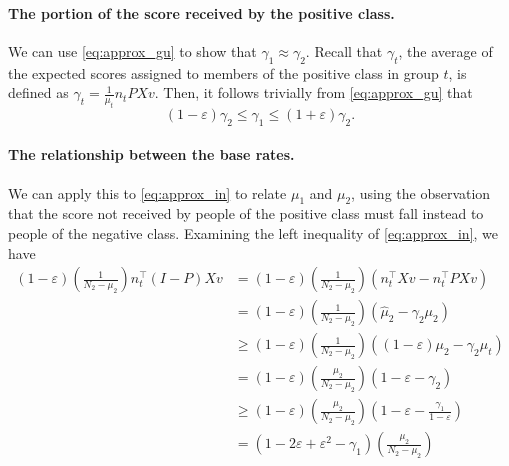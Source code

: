 \documentclass[11pt]{article}
\newcommand{\xhdr}[1]{\vspace{-0.2in} \paragraph*{\bf {#1}.}}
\def\tran{^{\top}}
\newcommand{\p}[1]{\left(#1\right)}
\begin{document}
\xhdr{The portion of the score received by the positive class}
We can use \eqref{eq:approx_gu} to show that $\gamma_1 \approx \gamma_2$.
Recall that $\gamma_t$, the average of the expected scores assigned
to members of the positive class in group $t$,
is defined as $\gamma_t =
\frac{1}{\mu_t} n_tPXv$. Then, it follows trivially from \eqref{eq:approx_gu}
that
\begin{equation}
  (1-\varepsilon) \gamma_2 \le \gamma_1 \le (1+\varepsilon) \gamma_2.
  \label{eq:approx_gamma}
\end{equation}

\xhdr{The relationship between the base rates}
We can apply this to \eqref{eq:approx_in} to relate $\mu_1$ and $\mu_2$, using
the observation that the score not received by people of the positive class must fall
instead to people of the negative class. Examining the left inequality of
\eqref{eq:approx_in}, we have
\begin{align*}
  (1-\varepsilon) \p{\frac{1}{N_2-\mu_2}} n_t\tran (I-P) Xv &= 
  (1-\varepsilon) \p{\frac{1}{N_2-\mu_2}} (n_t\tran Xv - n_t\tran PXv) \\
  &= (1-\varepsilon) \p{\frac{1}{N_2-\mu_2}} (\hat \mu_2 - \gamma_2 \mu_2) \\
  &\ge (1-\varepsilon) \p{\frac{1}{N_2-\mu_2}} ((1-\varepsilon) \mu_2 - \gamma_2
  \mu_t) \\
  &= (1-\varepsilon) \p{\frac{\mu_2}{N_2-\mu_2}} (1-\varepsilon - \gamma_2) \\
  &\ge (1-\varepsilon) \p{\frac{\mu_2}{N_2-\mu_2}} \p{1-\varepsilon -
  \frac{\gamma_1}{1-\varepsilon}} \\
  &= (1-2\varepsilon + \varepsilon^2 - \gamma_1)\p{\frac{\mu_2}{N_2-\mu_2}}
\end{align*}
\end{document}
